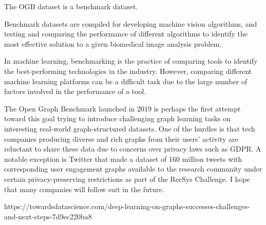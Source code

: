



The OGB dataset is a benchmark dataset.

Benchmark datasets are compiled for developing machine
vision algorithms, and testing and comparing the performance
of different algorithms to identify the most effective solution
to a given biomedical image analysis problem.


In machine learning, benchmarking is the practice of comparing tools
to identify the best-performing technologies in the industry. However,
comparing different machine learning platforms can be a difficult task due
to the large number of factors involved in the performance of a tool.




The Open Graph Benchmark launched in 2019 is perhaps the first attempt
toward this goal trying to introduce challenging graph learning tasks on
interesting real-world graph-structured datasets. One of the hurdles is that
tech companies producing diverse and rich graphs from their users’ activity
are reluctant to share these data due to concerns over privacy laws such as GDPR.
A notable exception is Twitter that made a dataset of 160 million tweets with
corresponding user engagement graphs available to the research community under
certain privacy-preserving restrictions as part of the RecSys Challenge. I hope
that many companies will follow suit in the future.

https://towardsdatascience.com/deep-learning-on-graphs-successes-challenges-and-next-steps-7d9ec220ba8

